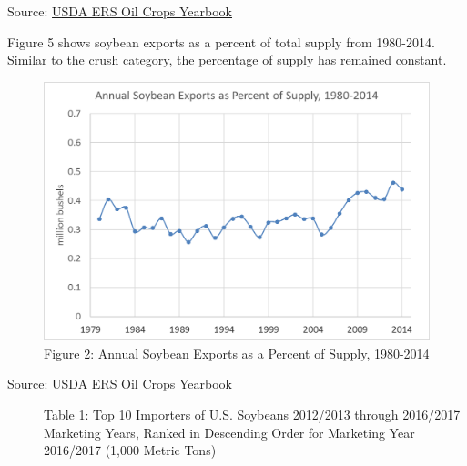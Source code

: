 \documentclass[
  letterpaper,
  DIV=11,
  numbers=noendperiod]{scrreprt}
\begin{document}
Source:
\href{http://www.ers.usda.gov/data-products/oil-crops-yearbook.aspx}{USDA
ERS Oil Crops Yearbook}

Figure 5 shows soybean exports as a percent of total supply from
1980-2014. Similar to the crush category, the percentage of supply has
remained constant.

\begin{figure}

{\centering \includegraphics{Excel-files/ForecastingUseSoy-OilCropsYearbook_files/image009.png}

}

\caption{Figure 2: Annual Soybean Exports as a Percent of Supply,
1980-2014}

\end{figure}

\begin{description}
\item[Source:
\href{http://www.ers.usda.gov/data-products/oil-crops-yearbook.aspx}{USDA
ERS Oil Crops Yearbook}]
Table 1: Top 10 Importers of U.S. Soybeans 2012/2013 through 2016/2017
Marketing Years, Ranked in Descending Order for Marketing Year 2016/2017
(1,000 Metric Tons)
\end{description}
\end{document}
